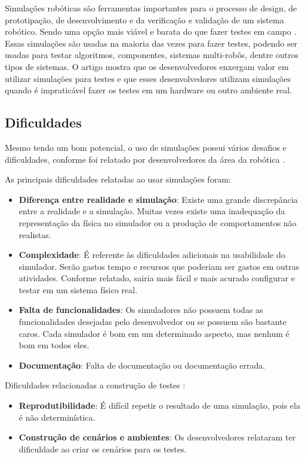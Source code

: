 
Simulações robóticas são ferramentas importantes para o processo de design, de prototipação, de desenvolvimento e da verificação e validação de um sistema robótico. Sendo uma opção mais viável e barata do que fazer testes em campo \cite{robotSimulation}. Essas simulações são usadas na maioria das vezes para fazer testes, podendo ser usadas para testar algoritmos, componentes, sistemas multi-robôs, dentre outros tipos de sistemas. O artigo \cite{robotSimulation} mostra que os desenvolvedores enxergam valor em utilizar simulações para testes e que esses desenvolvedores utilizam simulações quando é impraticável fazer os testes em um hardware ou outro ambiente real.


\subsection{Dificuldades}
Mesmo tendo um bom potencial, o uso de simulações possui vários desafios e dificuldades, conforme foi relatado por desenvolvedores da área da robótica \cite{robotSimulation}.

As principais dificuldades relatadas \cite{robotSimulation} ao usar simulações foram:

\begin{itemize}
    \item \textbf{Diferença entre realidade e simulação}: Existe uma grande discrepância entre a realidade e a simulação. Muitas vezes existe uma inadequação da representação da física no simulador ou a produção de comportamentos não realistas.
    \item \textbf{Complexidade}: É referente às dificuldades adicionais na usabilidade do simulador. Serão gastos tempo e recursos que poderiam ser gastos em outras atividades. Conforme relatado, sairia mais fácil e mais acurado configurar e testar em um sistema físico real.
    \item \textbf{Falta de funcionalidades}: Os simuladores não possuem todas as funcionalidades desejadas pelo desenvolvedor ou se possuem são bastante caros. Cada simulador é bom em um determinado aspecto, mas nenhum é bom em todos eles. 
    \item \textbf{Documentação}: Falta de documentação ou documentação errada.
\end{itemize}

Dificuldades relacionadas a construção de testes \cite{robotSimulation}:
\begin{itemize}
    \item \textbf{Reprodutibilidade}: É difícil repetir o resultado de uma simulação, pois ela é não determinística.
    \item \textbf{Construção de cenários e ambientes}: Os desenvolvedores relataram ter dificuldade ao criar os cenários para os testes.
\end{itemize}

